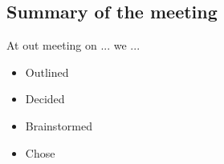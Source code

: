 \subsection{Summary of the meeting}
At out meeting on ... we ...
\begin{itemize}
\item Outlined
\item Decided
\item Brainstormed
\item Chose
\end{itemize}
